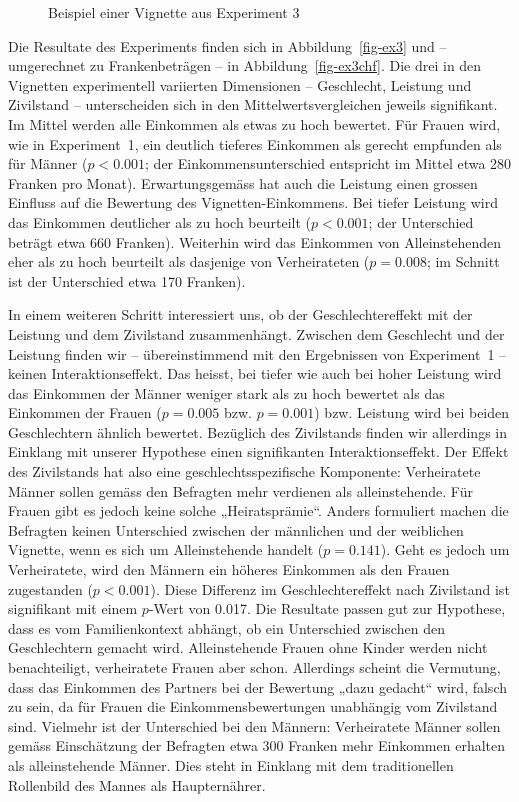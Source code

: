 \documentclass[a4paper,12pt]{article}
\begin{document}
\begin{figure}\centering
    \caption{Beispiel einer Vignette aus Experiment 3}\label{fig-3}
\end{figure}

Die Resultate des Experiments finden sich in Abbildung~\ref{fig-ex3} und –
umgerechnet zu Frankenbeträgen – in Abbildung~\ref{fig-ex3chf}. Die drei in den
Vignetten experimentell variierten Dimensionen -- Geschlecht, Leistung und
Zivilstand -- unterscheiden sich in den Mittelwertsvergleichen jeweils
signifikant. Im Mittel werden alle Einkommen als etwas zu hoch bewertet. Für
Frauen wird, wie in Experiment~1, ein deutlich tieferes Einkommen als gerecht
empfunden als für Männer ($p<0.001$; der Einkommensunterschied entspricht im
Mittel etwa 280 Franken pro Monat). Erwartungsgemäss hat auch die Leistung
einen grossen Einfluss auf die Bewertung des Vignetten-Einkommens. Bei tiefer
Leistung wird das Einkommen deutlicher als zu hoch beurteilt ($p<0.001$; der
Unterschied beträgt etwa 660 Franken). Weiterhin wird das Einkommen von
Alleinstehenden eher als zu hoch beurteilt als dasjenige von Verheirateten
($p=0.008$; im Schnitt ist der Unterschied etwa 170 Franken).

In einem weiteren Schritt interessiert uns, ob der Geschlechtereffekt mit der
Leistung und dem Zivilstand zusammenhängt. Zwischen dem Geschlecht und der
Leistung finden wir -- übereinstimmend mit den Ergebnissen von Experiment~1 --
keinen Interaktionseffekt. Das heisst, bei tiefer wie auch bei hoher Leistung
wird das Einkommen der Männer weniger stark als zu hoch bewertet als das
Einkommen der Frauen ($p=0.005$ bzw. $p=0.001$) bzw. Leistung wird bei beiden
Geschlechtern ähnlich bewertet. Bezüglich des Zivilstands finden wir allerdings
in Einklang mit unserer Hypothese einen signifikanten Interaktionseffekt. Der
Effekt des Zivilstands hat also eine geschlechtsspezifische Komponente:
Verheiratete Männer sollen gemäss den Befragten mehr verdienen als
alleinstehende. Für Frauen gibt es jedoch keine solche „Heiratsprämie“. Anders
formuliert machen die Befragten keinen Unterschied zwischen der männlichen und
der weiblichen Vignette, wenn es sich um Alleinstehende handelt ($p=0.141$).
Geht es jedoch um Verheiratete, wird den Männern ein höheres Einkommen als den
Frauen zugestanden ($p<0.001$). Diese Differenz im Geschlechtereffekt nach
Zivilstand ist signifikant mit einem $p$-Wert von 0.017. Die Resultate passen
gut zur Hypothese, dass es vom Familienkontext abhängt, ob ein Unterschied
zwischen den Geschlechtern gemacht wird. Alleinstehende Frauen ohne Kinder
werden nicht benachteiligt, verheiratete Frauen aber schon. Allerdings scheint
die Vermutung, dass das Einkommen des Partners bei der Bewertung „dazu gedacht“
wird, falsch zu sein, da für Frauen die Einkommensbewertungen unabhängig vom
Zivilstand sind. Vielmehr ist der Unterschied bei den Männern: Verheiratete
Männer sollen gemäss Einschätzung der Befragten etwa 300 Franken mehr Einkommen
erhalten als alleinstehende Männer. Dies steht in Einklang mit dem
traditionellen Rollenbild des Mannes als Haupternährer.
\end{document}
